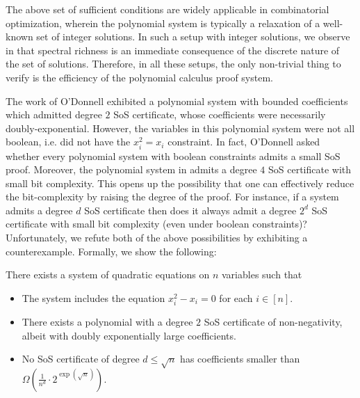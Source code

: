 The above set of sufficient conditions are widely applicable in combinatorial optimization, wherein the polynomial system is typically a relaxation of a well-known set of integer solutions.  
%
In such a setup with integer solutions, we observe in  that spectral richness is an immediate consequence of the discrete nature of the set of solutions.
%
Therefore, in all these setups, the only non-trivial thing to verify is the efficiency of the polynomial calculus proof system.
%


The work of O'Donnell \cite{odonnell17} exhibited a polynomial system with bounded coefficients which admitted degree $2$ SoS certificate, whose coefficients were necessarily doubly-exponential.
%
However, the variables in this polynomial system were not all boolean, i.e. did not have the $x_i^2 = x_i$ constraint.
%
In fact, O'Donnell asked whether every polynomial system with boolean constraints admits a small SoS proof.
%
Moreover, the polynomial system in \cite{odonnell17} admits a degree $4$ SoS certificate with small bit complexity.  
%
This opens up the possibility that one can effectively reduce the bit-complexity by raising the degree of the proof.
%
For instance, if a system admits a degree $d$ SoS certificate then does it always admit a degree $2^d$ SoS certificate with small bit complexity (even under boolean constraints)?
Unfortunately, we refute both of the above possibilities by exhibiting a counterexample.
%
Formally, we show the following:

\begin{theorem}\label{thm:counter}
	There exists a system of quadratic equations on $n$ variables such that
	\begin{itemize}
	\item The system includes the equation $x_i^2 - x_i = 0$ for each $i \in [n]$.
	\item There exists a polynomial with a degree $2$ SoS certificate of non-negativity, albeit with doubly exponentially large coefficients.
	\item No SoS certificate of degree $d \leq \sqrt{n}$ has coefficients smaller than $\Omega\left(\frac{1}{n^d}\cdot 2^{\exp(\sqrt{n})}\right)$.
	\end{itemize}	
\end{theorem}

